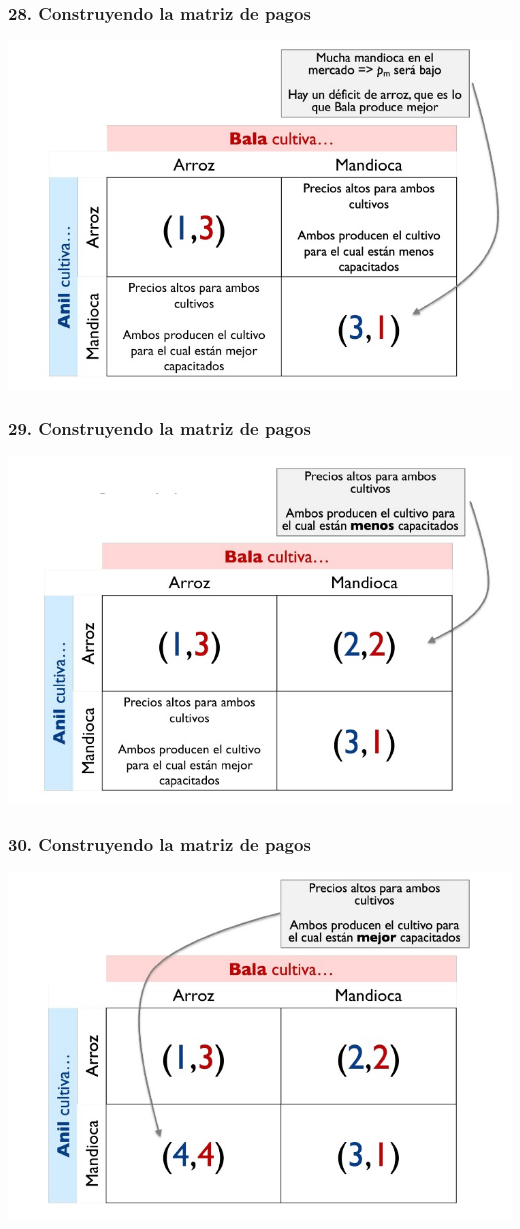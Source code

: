 \documentclass[14pt]{beamer}
\begin{document}
\begin{frame}
\frametitle{28. Construyendo la matriz de pagos}
\centering
\includegraphics[scale=0.6]{Figures/Tema_03_9_bala.jpg}
\end{frame}

\begin{frame}
\frametitle{29. Construyendo la matriz de pagos}
\centering
\includegraphics[scale=0.6]{Figures/Tema_03_10_bala.jpg}
\end{frame}

\begin{frame}
\frametitle{30. Construyendo la matriz de pagos}
\centering
\includegraphics[scale=0.6]{Figures/Tema_03_11_bala.jpg}
\end{frame}
\end{document}
